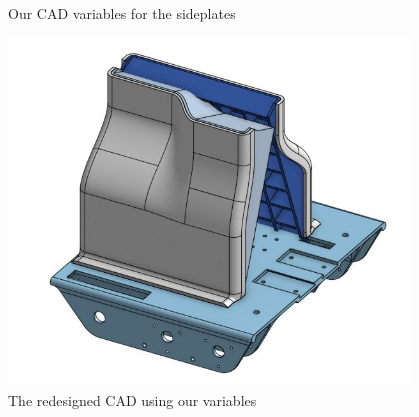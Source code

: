 \begin{figure}[ht]
\begin{minipage}[b]{.48\textwidth}
  \caption{Our CAD variables for the sideplates}
  \label{fig:112821_1}
\end{minipage}%
\hfill%
\begin{minipage}[b]{.48\textwidth}
  \centering
  \includegraphics[width=0.95\textwidth]{Meetings/November/11-28-21/11-28-21_CAD_Figure2 - Nathan Forrer.JPG}
  \caption{The redesigned CAD using our variables}
  \label{fig:112821_2}
\end{minipage}
\end{figure}



